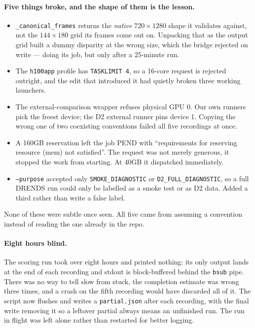 \documentclass[11pt,a4paper]{article}
\begin{document}
\paragraph{Five things broke, and the shape of them is the lesson.}
\begin{itemize}
\item \texttt{\_canonical\_frames} returns the \emph{native} $720\times1280$
      shape it validates against, not the $144\times180$ grid its frames come
      out on. Unpacking that as the output grid built a dummy disparity at the
      wrong size, which the bridge rejected on write --- doing its job, but
      only after a 25-minute run.
\item The \texttt{h100app} profile has \texttt{TASKLIMIT 4}, so a 16-core
      request is rejected outright, and the edit that introduced it had
      quietly broken three working launchers.
\item The external-comparison wrapper refuses physical GPU 0. Our own runners
      pick the freest device; the D2 external runner pins device 1. Copying
      the wrong one of two coexisting conventions failed all five recordings
      at once.
\item A 160GB reservation left the job PEND with ``requirements for reserving
      resource (mem) not satisfied''. The request was not merely generous, it
      stopped the work from starting. At 40GB it dispatched immediately.
\item \texttt{--purpose} accepted only \texttt{SMOKE\_DIAGNOSTIC} or
      \texttt{D2\_FULL\_DIAGNOSTIC}, so a full DRENDS run could only be
      labelled as a smoke test or as D2 data. Added a third rather than write
      a false label.
\end{itemize}

None of these were subtle once seen. All five came from assuming a convention
instead of reading the one already in the repo.

\paragraph{Eight hours blind.} The scoring run took over eight hours and
printed nothing: its only output lands at the end of each recording and
stdout is block-buffered behind the \texttt{bsub} pipe. There was no way to
tell slow from stuck, the completion estimate was wrong three times, and a
crash on the fifth recording would have discarded all of it. The script now
flushes and writes a \texttt{partial.json} after each recording, with the
final write removing it so a leftover partial always means an unfinished run.
The run in flight was left alone rather than restarted for better logging.
\end{document}
